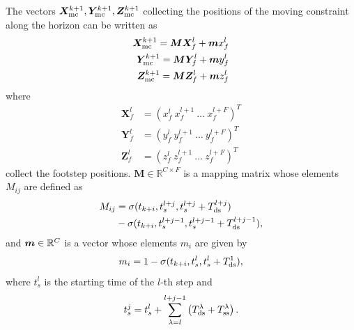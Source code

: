 The vectors $\bm{X}_{\rm mc}^{k+1}, \bm{Y}_{\rm mc}^{k+1}, \bm{Z}_{\rm mc}^{k+1}$
collecting the positions of the moving constraint along the horizon
can be written as
\begin{equation}
    \begin{aligned}
        \bm{X}_{\rm mc}^{k+1} = \bm{M} \bm{X}_f^l + \bm{m}x_f^l \\
        \bm{Y}_{\rm mc}^{k+1} = \bm{M} \bm{Y}_f^l + \bm{m}y_f^l \\
        \bm{Z}_{\rm mc}^{k+1} = \bm{M} \bm{Z}_f^l + \bm{m}z_f^l
    \end{aligned}
    \label{eq:FAPA:mapping}
\end{equation}
where
\begin{equation*}
    \begin{aligned}
        \bm{X}_{f}^{l} &= (x_{f}^{l} \ x_{f}^{l+1} \ \dots \ x_{f}^{l+F})^T \\
        \bm{Y}_{f}^{l} &= (y_{f}^{l} \ y_{f}^{l+1} \ \dots \ y_{f}^{l+F})^T \\
        \bm{Z}_{f}^{l} &= (z_{f}^{l} \ z_{f}^{l+1} \ \dots \ z_{f}^{l+F})^T
    \end{aligned}
\end{equation*}
collect the footstep positions.
$\bm{M}\in\mathbb{R}^{C\times F}$ is a mapping matrix whose elements
$M_{ij}$ are defined as
\begin{equation}\begin{split}
M_{ij} &= \sigma(t_{k+i}, t_s^{l+j},t_s^{l+j}+T_{\rm ds}^{l+j})\\ &- \sigma(t_{k+i}, t_s^{l+j-1},t_s^{l+j-1}+T_{\rm ds}^{l+j-1}),
\end{split}\end{equation}
and ${\bm{m}}\in\mathbb{R}^{C}$ is a vector whose elements $m_i$ are given by
\begin{equation*}
m_{i} = 1 - \sigma(t_{k+i}, t_s^{l},t_s^{l}+T_{\rm ds}^{1}),
\end{equation*}
where $t_s^l$ is the starting time of the $l$-th step and
\begin{equation*}
    t^j_s = t^l_s + \sum^{l+j-1}_{\lambda=l} \left(T_{\rm ds}^\lambda + T_{\rm ss}^\lambda\right).
\end{equation*}

